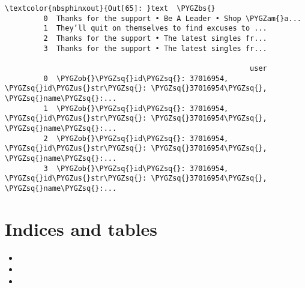 \documentclass[letterpaper,10pt,english]{sphinxmanual}
\begin{document}
%
\begin{Verbatim}[commandchars=\\\{\}]
\textcolor{nbsphinxout}{Out[65]: }text  \PYGZbs{}
         0  Thanks for the support • Be A Leader • Shop \PYGZam{}a...
         1  They’ll quit on themselves to find excuses to ...
         2  Thanks for the support • The latest singles fr...
         3  Thanks for the support • The latest singles fr...
         
                                                         user
         0  \PYGZob{}\PYGZsq{}id\PYGZsq{}: 37016954, \PYGZsq{}id\PYGZus{}str\PYGZsq{}: \PYGZsq{}37016954\PYGZsq{}, \PYGZsq{}name\PYGZsq{}:...
         1  \PYGZob{}\PYGZsq{}id\PYGZsq{}: 37016954, \PYGZsq{}id\PYGZus{}str\PYGZsq{}: \PYGZsq{}37016954\PYGZsq{}, \PYGZsq{}name\PYGZsq{}:...
         2  \PYGZob{}\PYGZsq{}id\PYGZsq{}: 37016954, \PYGZsq{}id\PYGZus{}str\PYGZsq{}: \PYGZsq{}37016954\PYGZsq{}, \PYGZsq{}name\PYGZsq{}:...
         3  \PYGZob{}\PYGZsq{}id\PYGZsq{}: 37016954, \PYGZsq{}id\PYGZus{}str\PYGZsq{}: \PYGZsq{}37016954\PYGZsq{}, \PYGZsq{}name\PYGZsq{}:...
\end{Verbatim}


\chapter{Indices and tables}
\label{\detokenize{index:indices-and-tables}}\begin{itemize}
\item {} 

\item {} 

\item {} 

\end{itemize}



\renewcommand{\indexname}{Index}
\printindex
\end{document}
